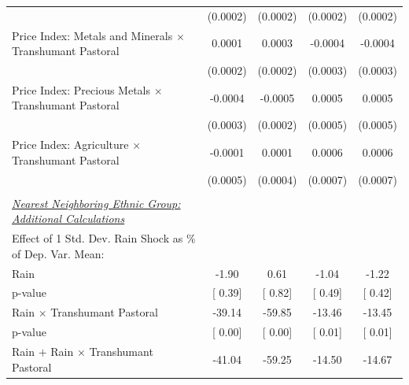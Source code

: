 {\begin{tabular}{l*{4}{c}}
                    &(0.0002)         &(0.0002)         &(0.0002)         &(0.0002)         \\
\addlinespace
\hspace{15pt} Price Index: Metals and Minerals  $\times$ Transhumant Pastoral&0.0001         &0.0003         &-0.0004         &-0.0004         \\
                    &(0.0002)         &(0.0002)         &(0.0003)         &(0.0003)         \\
\addlinespace
\hspace{15pt} Price Index: Precious Metals  $\times$ Transhumant Pastoral&-0.0004         &-0.0005\sym{*}  &0.0005         &0.0005         \\
                    &(0.0003)         &(0.0002)         &(0.0005)         &(0.0005)         \\
\addlinespace
\hspace{15pt} Price Index: Agriculture  $\times$ Transhumant Pastoral&-0.0001         &0.0001         &0.0006         &0.0006         \\
                    &(0.0005)         &(0.0004)         &(0.0007)         &(0.0007)         \\
\midrule
\\ \underline{\emph{Nearest Neighboring Ethnic Group: Additional Calculations}} &               &               &               &               \\
[1em] Effect of 1 Std. Dev. Rain Shock as $\%$ of Dep. Var. Mean:&               &               &               &               \\
\hspace{15pt} Rain  & -1.90         &  0.61         & -1.04         & -1.22         \\
\hspace{15pt} p-value&[     0.39]         &[     0.82]         &[     0.49]         &[     0.42]         \\
[1em] \hspace{15pt} Rain $\times$ Transhumant Pastoral&-39.14         &-59.85         &-13.46         &-13.45         \\
\hspace{15pt} p-value&[     0.00]         &[     0.00]         &[     0.01]         &[     0.01]         \\
[1em]  \hspace{15pt} Rain $+$ Rain $\times$ Transhumant Pastoral&-41.04         &-59.25         &-14.50         &-14.67         \\

\end{tabular}}
